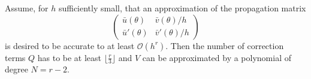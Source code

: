 \begin{theorem}\label{the:c2_delta_formulae}
    Assume, for $h$ sufficiently small, that an approximation of the propagation matrix %
    $$
        \begin{pmatrix}
            \bar{u}(\theta)  & \bar{v}(\theta)/h  \\
            \bar{u}'(\theta) & \bar{v}'(\theta)/h
        \end{pmatrix}
    $$
    is desired to be accurate to at least $\mathcal{O}(h^r)$. %
    Then the number of correction terms $Q$ has to be at least $\lfloor\frac{r}{3} \rfloor$
    and $V$ can be approximated by a polynomial of degree $N=r-2$.

\end{theorem}
